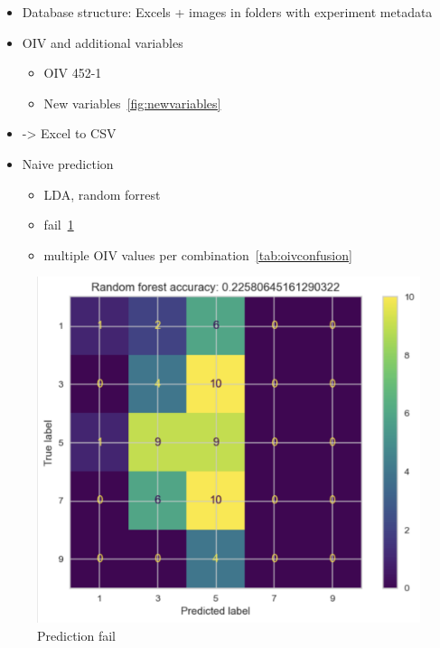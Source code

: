 \documentclass[english]{article}
\begin{document}
\begin{itemize}
	\item Database structure: Excels + images in folders with experiment metadata
	\item OIV and additional variables
	      \begin{itemize}
		      \item OIV 452-1
		      \item New variables~\ref*{fig:newvariables}
	      \end{itemize}
	\item -> Excel to CSV
	\item Naive prediction
	      \begin{itemize}
		      \item LDA, random forrest
		      \item fail~\ref{fig:predictionfail}
		      \item multiple OIV values per combination~\ref*{tab:oivconfusion}
	      \end{itemize}
\end{itemize}

\begin{figure}[H]
	\begin{center}
		\includegraphics[width=0.7\linewidth,trim={1mm 0 0 0},clip]{annotations_da_rfc_cm.png}
		\caption{Prediction fail}\label{fig:predictionfail}
	\end{center}
\end{figure}
\end{document}
